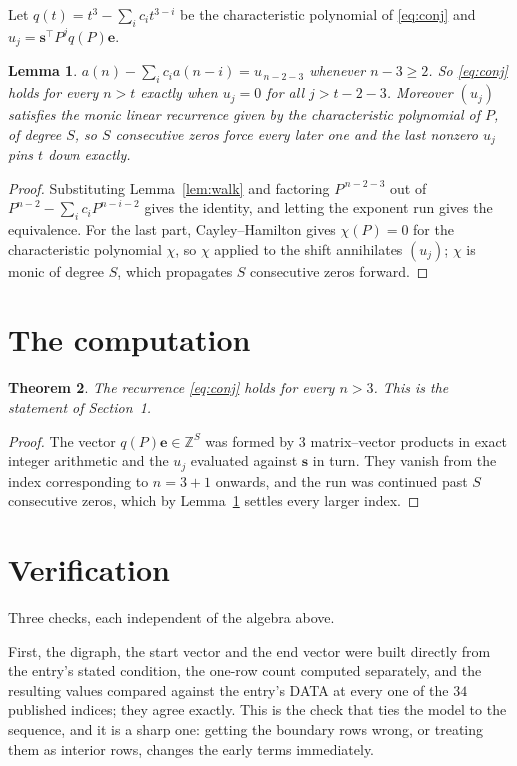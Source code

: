 \documentclass[11pt,a4paper]{article}
\theoremstyle{plain}
\newtheorem{theorem}{Theorem}
\newtheorem{lemma}[theorem]{Lemma}
\theoremstyle{definition}
\begin{document}
Let $q(t)=t^{3}-\sum_i c_i t^{3-i}$ be the characteristic polynomial of
\eqref{eq:conj} and $u_j=\mathbf{s}^{\!\top}P^{j}q(P)\mathbf{e}$.

\begin{lemma}\label{lem:crit}
$a(n)-\sum_i c_i a(n-i)=u_{\,n-2-3}$ whenever $n-3\ge2$. So \eqref{eq:conj}
holds for every $n>t$ exactly when $u_j=0$ for all $j>t-2-3$. Moreover $(u_j)$
satisfies the monic linear recurrence given by the characteristic polynomial of $P$, of
degree $S$, so $S$ consecutive zeros force every later one and the last nonzero $u_j$ pins
$t$ down exactly.
\end{lemma}

\begin{proof}
Substituting Lemma~\ref{lem:walk} and factoring $P^{\,n-2-3}$ out of
$P^{n-2}-\sum_i c_i P^{n-i-2}$ gives the identity, and letting the exponent run gives the
equivalence. For the last part, Cayley--Hamilton gives $\chi(P)=0$ for the characteristic
polynomial $\chi$, so $\chi$ applied to the shift annihilates $(u_j)$; $\chi$ is monic of
degree $S$, which propagates $S$ consecutive zeros forward.
\end{proof}

\section{The computation}

\begin{theorem}
The recurrence \eqref{eq:conj} holds for every $n>3$. This is the statement of
Section~1.
\end{theorem}

\begin{proof}
The vector $q(P)\mathbf{e}\in\mathbb{Z}^{S}$ was formed by $3$ matrix--vector
products in exact integer arithmetic and the $u_j$ evaluated against $\mathbf{s}$ in turn.
They vanish from the index corresponding to $n=3+1$ onwards, and the run was continued
past $S$ consecutive zeros, which by Lemma~\ref{lem:crit} settles every larger index.
\end{proof}

\section{Verification}

Three checks, each independent of the algebra above.

First, the digraph, the start vector and the end vector were built directly from the
entry's stated condition, the one-row count computed separately, and the resulting values
compared against the entry's DATA at every one of the $34$ published indices; they
agree exactly. This is the check that ties the model to the sequence, and it is a sharp one:
getting the boundary rows wrong, or treating them as interior rows, changes the early terms
immediately.
\end{document}
